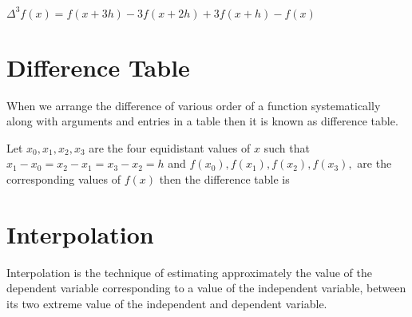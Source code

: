 \documentclass[11pt, a4paper]{article}
\begin{document}
\begin{tcolorbox}
  \begin{center}

    $\Delta^3f(x) = f(x+3h)-3f(x+2h)+3f(x+h)-f(x)$

  \end{center}
\end{tcolorbox}%

\section{Difference Table}%
When we arrange the difference of various order of a function systematically 
along with arguments and entries in a table then it is known as difference
table.

Let $x_0, x_1, x_2, x_3$ are the four equidistant values of $x$ such that $x_1-
x_0=x_2-x_1=x_3-x_2=h$ and $f(x_0), f(x_1), f(x_2), f(x_3),$ are the
corresponding values of $f(x)$ then the difference table is

\begin{table}[ht]
\end{table}%

\section{Interpolation}%
Interpolation is the technique of estimating approximately the value of the
dependent variable corresponding to a value of the independent variable, 
between its two extreme value of the independent and dependent variable.
\end{document}
